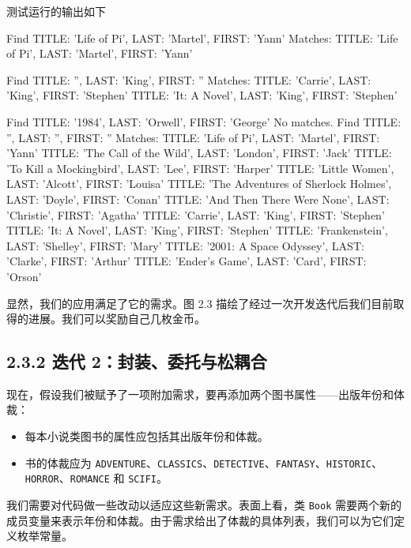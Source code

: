 测试运行的输出如下

\begin{codebox}
Find {TITLE: 'Life of Pi', LAST: 'Martel', FIRST: 'Yann'}
Matches:
  {TITLE: 'Life of Pi', LAST: 'Martel', FIRST: 'Yann'}

Find {TITLE: '', LAST: 'King', FIRST: ''}
Matches:
  {TITLE: 'Carrie', LAST: 'King', FIRST: 'Stephen'}
  {TITLE: 'It: A Novel', LAST: 'King', FIRST: 'Stephen'}

Find {TITLE: '1984', LAST: 'Orwell', FIRST: 'George'}
No matches.
Find {TITLE: '', LAST: '', FIRST: ''}
Matches:
  {TITLE: 'Life of Pi', LAST: 'Martel', FIRST: 'Yann'}
  {TITLE: 'The Call of the Wild', LAST: 'London', FIRST: 'Jack'}
  {TITLE: 'To Kill a Mockingbird', LAST: 'Lee', FIRST: 'Harper'}
  {TITLE: 'Little Women', LAST: 'Alcott', FIRST: 'Louisa'}
  {TITLE: 'The Adventures of Sherlock Holmes', LAST: 'Doyle', FIRST: 'Conan'}
  {TITLE: 'And Then There Were None', LAST: 'Christie', FIRST: 'Agatha'}
  {TITLE: 'Carrie', LAST: 'King', FIRST: 'Stephen'}
  {TITLE: 'It: A Novel', LAST: 'King', FIRST: 'Stephen'}
  {TITLE: 'Frankenstein', LAST: 'Shelley', FIRST: 'Mary'}
  {TITLE: '2001: A Space Odyssey', LAST: 'Clarke', FIRST: 'Arthur'}
  {TITLE: 'Ender's Game', LAST: 'Card', FIRST: 'Orson'}
\end{codebox}

显然，我们的应用满足了它的需求。图 2.3 描绘了经过一次开发迭代后我们目前取得的进展。我们可以奖励自己几枚金币。


\subsection{2.3.2 迭代 2：封装、委托与松耦合}

现在，假设我们被赋予了一项附加需求，要再添加两个图书属性——出版年份和体裁：

\begin{itemize}
\item 每本小说类图书的属性应包括其出版年份和体裁。
\item 书的体裁应为 \texttt{ADVENTURE}、\texttt{CLASSICS}、\texttt{DETECTIVE}、\texttt{FANTASY}、\texttt{HISTORIC}、\texttt{HORROR}、\texttt{ROMANCE} 和 \texttt{SCIFI}。
\end{itemize}

我们需要对代码做一些改动以适应这些新需求。表面上看，类 \texttt{Book} 需要两个新的成员变量来表示年份和体裁。由于需求给出了体裁的具体列表，我们可以为它们定义枚举常量。

